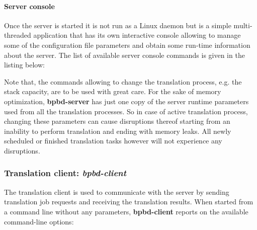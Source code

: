 \paragraph*{Server console}

Once the server is started it is not run as a Linux daemon but is a simple multi-\/threaded application that has its own interactive console allowing to manage some of the configuration file parameters and obtain some run-\/time information about the server. The list of available server console commands is given in the listing below\+:


 Note that, the commands allowing to change the translation process, e.\+g. the stack capacity, are to be used with great care. For the sake of memory optimization, {\bfseries bpbd-\/server} has just one copy of the server runtime parameters used from all the translation processes. So in case of active translation process, changing these parameters can cause disruptions thereof starting from an inability to perform translation and ending with memory leaks. All newly scheduled or finished translation tasks however will not experience any disruptions.

\subsubsection*{Translation client\+: {\itshape bpbd-\/client}}

The translation client is used to communicate with the server by sending translation job requests and receiving the translation results. When started from a command line without any parameters, {\bfseries bpbd-\/client} reports on the available command-\/line options\+:


